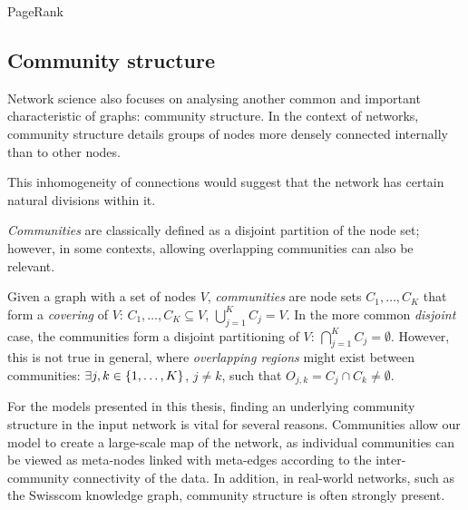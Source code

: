 \begin{algorithm}%
\caption{PageRank}
\label{algorithm:pagerank}
\begin{algorithmic}
\end{algorithmic}
\end{algorithm}

\subsection{Community structure}
Network science also focuses on analysing another common and important characteristic of graphs: community structure. In the context of networks, community structure details groups of nodes more densely connected internally than to other nodes. 

This inhomogeneity of connections would suggest that the network has certain natural divisions within it.

\emph{Communities} are classically defined as a disjoint partition of the node set; however, in some contexts, allowing overlapping communities can also be relevant.
\begin{definition}
Given a graph with a set of nodes $V$, \emph{communities} are node sets $C_1, \dots, C_K$ that form a \emph{covering} of $V$: $C_1, \dots, C_K \subseteq V$, $\bigcup_{j=1}^{K}{C_j} = V$. In the more common \emph{disjoint} case, the communities form a disjoint partitioning of $V$: $\bigcap_{j=1}^{K}{C_j}=\emptyset$. However, this is not true in general, where \emph{overlapping regions} might exist between communities: $\exists j,k \in \mathopen{}\left\{1,\dots,K\right\}$, $j \neq k$, such that $O_{j,k} = C_j \cap C_k \neq \emptyset$.
\end{definition} 

For the models presented in this thesis, finding an underlying community structure in the input network is vital for several reasons. Communities allow our model to create a large-scale map of the network, as individual communities can be viewed as meta-nodes linked with meta-edges according to the inter-community connectivity of the data. In addition, in real-world networks, such as the Swisscom knowledge graph, community structure is often strongly present.

